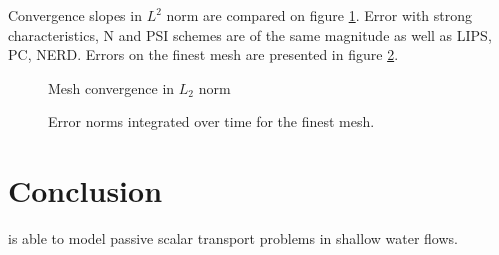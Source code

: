 Convergence slopes in $L^2$ norm are compared on figure \ref{t2d:cone:error_timeintegrals}.
Error with strong characteristics, N and PSI schemes are of the same magnitude as well as 
LIPS, PC, NERD.
Errors on the finest mesh are presented in figure \ref{t2d:cone:error_timeintegrals_mesh3}.

\begin{figure}[h!]
\centering
{}
\caption{Mesh convergence in $L_2$ norm}
\label{t2d:cone:error_timeintegrals}
\end{figure}

\begin{figure}[H]
\centering
{}
\caption{Error norms integrated over time for the finest mesh.}
\label{t2d:cone:error_timeintegrals_mesh3}
\end{figure}


\section{Conclusion}
 is able to model passive scalar transport problems in shallow water flows. 



